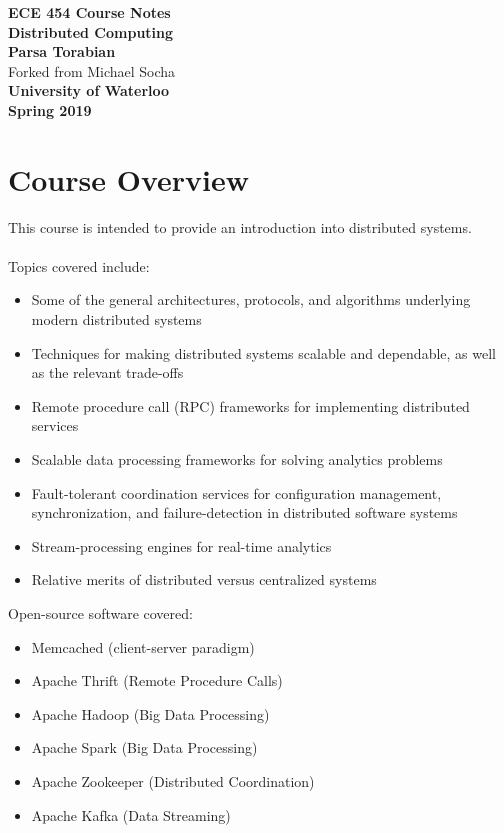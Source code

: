 \documentclass[12pt,titlepage]{article}
\let\stdsection\section
\renewcommand\section{\clearpage\stdsection}
\begin{document}
  \begin{titlepage}
    \vspace*{\fill}
    \centering

    \textbf{\Huge ECE 454 Course Notes} \\ [0.4em]
    \textbf{\Large Distributed Computing} \\ [1em]
    \textbf{\Large Parsa Torabian} \\ [1em]
    \Large Forked from Michael Socha \\
    \textbf{\large University of Waterloo} \\
    \textbf{\large Spring 2019} \\
    \vspace*{\fill}
  \end{titlepage}

  \newpage 


  \tableofcontents

  \newpage


  \section{Course Overview}
    This course is intended to provide an introduction into distributed systems. \\ \\ Topics covered include:
    \begin{itemize}
      \item Some of the general architectures, protocols, and algorithms underlying modern distributed systems
      \item Techniques for making distributed systems scalable and dependable, as well as the relevant trade-offs
      \item Remote procedure call (RPC) frameworks for implementing distributed services
      \item Scalable data processing frameworks for solving analytics problems
      \item Fault-tolerant coordination services for configuration management, synchronization, and failure-detection
        in distributed software systems
      \item Stream-processing engines for real-time analytics
      \item Relative merits of distributed versus centralized systems \\
    \end{itemize}
    Open-source software covered:
    \begin{itemize}
    \item Memcached (client-server paradigm)
    \item Apache Thrift (Remote Procedure Calls)
    \item Apache Hadoop (Big Data Processing)
    \item Apache Spark (Big Data Processing)
    \item Apache Zookeeper (Distributed Coordination)
    \item Apache Kafka (Data Streaming)
    \end{itemize}
\end{document}
